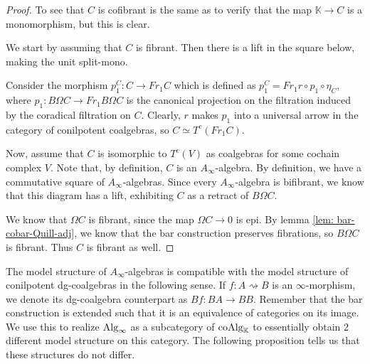 \documentclass[../thesis.tex]{subfiles}
\begin{document}
        \begin{proof}
            To see that $C$ is cofibrant is the same as to verify that the map $\mathbb{K}\rightarrow C$ is a monomorphism, but this is clear.

            We start by assuming that $C$ is fibrant. Then there is a lift in the square below, making the unit split-mono.
            \begin{center}
            \end{center}
            Consider the morphism $p_1^C : C \rightarrow Fr_1C$ which is defined as $p_1^C = Fr_1r\circ p_1\circ \eta_C$, where $p_1 : B\Omega C \rightarrow Fr_1 B\Omega C$ is the canonical projection on the filtration induced by the coradical filtration on $C$. Clearly, $r$ makes $p_1$ into a universal arrow in the category of conilpotent coalgebras, so $C \simeq T^c(Fr_1C)$.

            Now, assume that $C$ is isomorphic to $T^c(V)$ as coalgebras for some cochain complex $V$. Note that, by definition, $C$ is an $A_\infty$-algebra. By definition, we have a commutative square of $A_\infty$-algebras. Since every $A_\infty$-algebra is bifibrant, we know that this diagram has a lift, exhibiting $C$ as a retract of $B\Omega C$.
            \begin{center}
            \end{center}

            We know that $\Omega C$ is fibrant, since the map $\Omega C \rightarrow 0$ is epi. By lemma \ref{lem: bar-cobar-Quill-adj}, we know that the bar construction preserves fibrations, so $B\Omega C$ is fibrant. Thus $C$ is fibrant as well.
        \end{proof}

        The model structure of $A_\infty$-algebras is compatible with the model structure of conilpotent dg-coalgebras in the following sense. If $f : A \rightsquigarrow B$ is an $\infty$-morphism, we denote its dg-coalgebra counterpart as $Bf : BA \rightarrow BB$. Remember that the bar construction is extended such that it is an equivalence of categories on its image. We use this to realize $\tt{Alg}_\infty$ as a subcategory of $\tt{coAlg}_\mathbb{K}$ to essentially obtain 2 different model structure on this category. The following proposition tells us that these structures do not differ.
\end{document}

